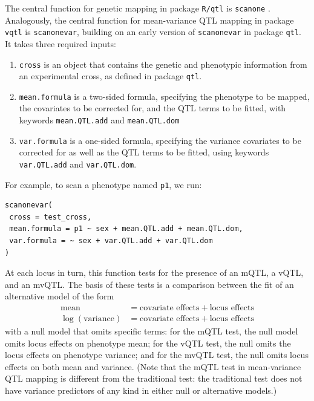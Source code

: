 \documentclass[9pt,twocolumn,twoside]{gsag3jnl}
\begin{document}
The central function for genetic mapping in package \texttt{R/qtl} is \texttt{scanone} \citep{Broman2003}.
Analogously, the central function for mean-variance QTL mapping in package \texttt{vqtl} is \texttt{scanonevar}, building on an early version of \texttt{scanonevar} in package \texttt{qtl}.
It takes three required inputs:
\begin{enumerate}
    \item \texttt{cross} is an object that contains the genetic and phenotypic information from an experimental cross, as defined in package \texttt{qtl}.
    \item \texttt{mean.formula} is a two-sided formula, specifying the phenotype to be mapped, the covariates to be corrected for, and the QTL terms to be fitted, with keywords \texttt{mean.QTL.add} and \texttt{mean.QTL.dom}
    \item \texttt{var.formula} is a one-sided formula, specifying the variance covariates to be corrected for as well as the QTL terms to be fitted, using keywords \texttt{var.QTL.add} and \texttt{var.QTL.dom}.
\end{enumerate}
For example, to scan a phenotype named \texttt{p1}, we run:
\begin{verbatim}
scanonevar(
 cross = test_cross,
 mean.formula = p1 ~ sex + mean.QTL.add + mean.QTL.dom,
 var.formula = ~ sex + var.QTL.add + var.QTL.dom
)
\end{verbatim}
At each locus in turn, this function tests for the presence of an mQTL, a vQTL, and an mvQTL. The basis of these tests is a comparison between the fit of an alternative model of the form
\begin{align*}
    \text{mean} &= \text{covariate effects} + \text{locus effects}\\
    \log(\text{variance}) &= \text{covariate effects} + \text{locus effects}    
\end{align*}
with a null model that omits specific terms: for the mQTL test, the null model omits locus effects on phenotype mean; for the vQTL test, the null omits the locus effects on phenotype variance; and for the mvQTL test, the null omits locus effects on both mean and variance.
(Note that the mQTL test in mean-variance QTL mapping is different from the traditional test: the traditional test does not have variance predictors of any kind in either null or alternative models.)
\end{document}
